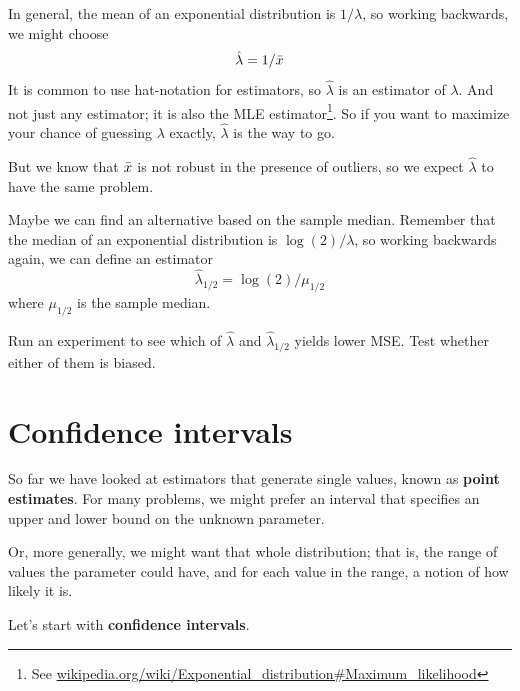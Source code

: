 \documentclass[12pt]{book}
\begin{document}
\newcommand{\lamhat}{\hat{\lambda}}
\newcommand{\lamhatmed}{\hat{\lambda}_{1/2}}

In general, the mean of an exponential distribution is $1 / \lambda$,
so working backwards, we might choose
%
\[ \lamhat = 1 / \xbar \]
%
It is common to use hat-notation for estimators, so $\lamhat$ is an
estimator of $\lambda$.  And not just any estimator; it is also the
MLE estimator\footnote{See
\url{wikipedia.org/wiki/Exponential_distribution#Maximum_likelihood}}.
So if you want to maximize your chance of guessing $\lambda$ exactly,
$\lamhat$ is the way to go.

But we know that $\bar{x}$ is not robust in the presence of outliers, so
we expect $\lamhat$ to have the same problem.

Maybe we can find an alternative based on the sample median.  Remember
that the median of an exponential distribution is $\log(2) / \lambda$,
so working backwards again, we can define an estimator
%
\[ \lamhatmed = \log(2) / \mu_{1/2} \]
%
where $\mu_{1/2}$ is the sample median.

\begin{ex}

Run an experiment to see which of $\lamhat$ and $\lamhatmed$ yields
lower MSE.  Test whether either of them is biased.


\end{ex}


\section{Confidence intervals}

So far we have looked at estimators that generate single values, known
as {\bf point estimates}.  For many problems, we might prefer an interval
that specifies an upper and lower bound on the unknown parameter.

Or, more generally, we might want that whole distribution; that is,
the range of values the parameter could have, and for each value in
the range, a notion of how likely it is.

Let's start with {\bf confidence intervals}.

\end{document}
